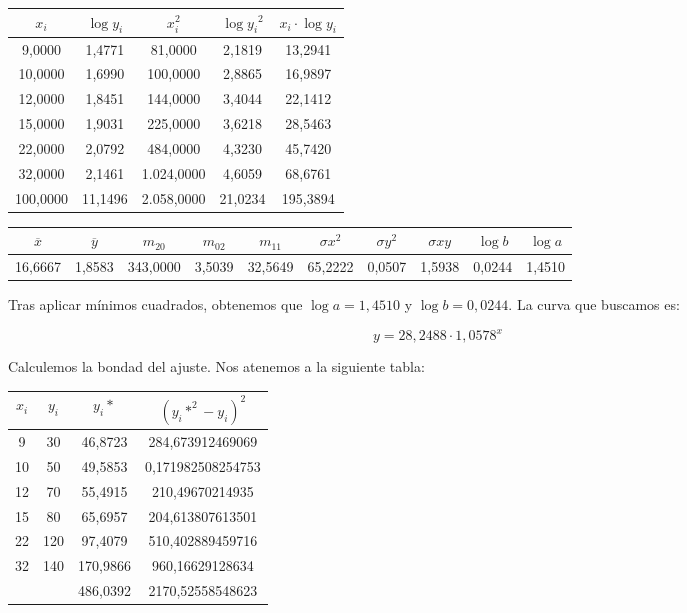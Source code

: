 \documentclass{article}
\begin{document}
\begin{center}
	\begin{tabular}{ c|c|c c c }
	
	$x_i$ & $\log{y_i}$ & $x_i^2$ & $\log{y_i}^2$ & $x_i·\log{y_i}$ \\ \hline
	9,0000 & 1,4771 & 81,0000 & 2,1819 & 13,2941 \\ 
	10,0000 & 1,6990 & 100,0000 & 2,8865 & 16,9897 \\ 
	12,0000 & 1,8451 & 144,0000 & 3,4044 & 22,1412 \\ 
	15,0000 & 1,9031 & 225,0000 & 3,6218 & 28,5463 \\ 
	22,0000 & 2,0792 & 484,0000 & 4,3230 & 45,7420 \\ 
	32,0000 & 2,1461 & 1.024,0000 & 4,6059 & 68,6761 \\ \hline
	100,0000 & 11,1496 & 2.058,0000 & 21,0234 & 195,3894 \\ 
\end{tabular}
\end{center}


\vspace{1em}

\tiny
\begin{tabular}{|c|c|c|c|c|c|c|c|c|c|}
	\hline
	$\overline{x}$ & $\overline{y}$ & $m_{20}$ & $m_{02}$ & $m_{11}$ & $\sigma{x}^2$ & $\sigma{y}^2$ & $\sigma{xy}$ & $\log{b}$ & $\log{a}$  \\ \hline
16,6667 & 1,8583 & 343,0000 & 3,5039 & 32,5649 & 65,2222 & 0,0507 & 1,5938 & 0,0244 & 1,4510 \\ \hline
\end{tabular}
\normalsize

\vspace{1em}

Tras aplicar mínimos cuadrados, obtenemos que $\log{a} = 1,4510$ y $\log{b}=0,0244$. La curva que buscamos es:

$$y=28,2488\cdot1,0578^{x}$$

Calculemos la bondad del ajuste. Nos atenemos a la siguiente tabla:

\begin{center}
	\begin{tabular}{|c|c|c|c|}
	\hline
	$x_i$ & $y_i$ & $y_i*$ & $(y_i*^2-y_i)^2$ \\ \hline
	9 & 30 & 46,8723 & 284,673912469069 \\ 
	10 & 50 & 49,5853 & 0,171982508254753 \\ 
	12 & 70 & 55,4915 & 210,49670214935 \\ 
	15 & 80 & 65,6957 & 204,613807613501 \\ 
	22 & 120 & 97,4079 & 510,402889459716 \\ 
	32 & 140 & 170,9866 & 960,16629128634 \\ \hline
	\multicolumn{1}{|l|}{} & \multicolumn{1}{l|}{} & 486,0392 & 2170,52558548623 \\ \hline
\end{tabular}
\end{center}
\end{document}
